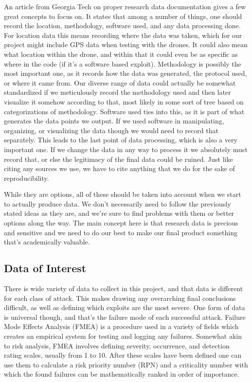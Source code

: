 \documentclass[IEEEtran,letterpaper,10pt,notitlepage,draftclsnofoot,onecolumn]{article}
\begin{document}
An article from Georgia Tech on proper research data documentation gives a few great concepts to focus on. \cite{GTDD}
It states that among a number of things, one should record the location, methodology, software used, and any data processing done. 
For location data this means recording where the data was taken, which for our project might include GPS data when testing with the drones. 
It could also mean what location within the drone, and within that it could even be as specific as where in the code (if it's a software based exploit).
Methodology is possibly the most important one, as it records how the data was generated, the protocol used, or where it came from.
Our diverse range of data could actually be somewhat standardized if we meticulously record the methodology used and then later visualize it somehow according to that, most likely in some sort of tree based on categorizations of methodology. 
Software used ties into this, as it is part of what generates the data points we output. 
If we used software in manipulating, organizing, or visualizing the data though we would need to record that separately. 
This leads to the last point of data processing, which is also a very important one.
If we change the data in any way to process it we absolutely must record that, or else the legitimacy of the final data could be ruined.
Just like citing any sources we use, we have to cite anything that we do for the sake of reproducibility.

While they are options, all of these should be taken into account when we start to actually produce data. 
We don't necessarily need to follow the previously stated ideas as they are, and we're sure to find problems with them or better options along the way.
The main concept here is that research data is precious and sensitive and we need to do our best to make our final product something that's academically valuable.

\subsection{Data of Interest}
There is wide variety of data to collect in this project, and that data is different for each class of attack.
This makes drawing any overarching final conclusions difficult, as well as defining which exploits are the most severe.
One form of data is universal though, and that's the failure mode of each successful attack.
Failure Mode Effects Analysis (FMEA) is a procedure used in a variety of fields which creates an empirical system for testing and logging any failures.
Somewhat akin to risk analysis, FMEA involves defining severity, occurrence, and detection rating scales, usually from 1 to 10.
After these scales have been defined one can use them to calculate a risk priority number (RPN) and a criticality number with which the found failures can be mathematically ranked in order of importance. \cite{FMEA}
\end{document}
